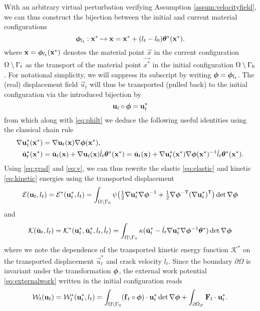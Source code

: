 With an arbitrary virtual perturbation verifying Assumption \ref{assum:velocityfield}, we can thus construct the bijection between the initial and current material configurations
\begin{equation} \label{eq:philt}
\philt_{l_t}:\vec{x}^*\mapsto\vec{x}=\vec{x}^*+(l_t-l_0)\vtheta^*(\vec{x}^*).
\end{equation}
where $\vec{x}=\philt_{l_t}(\vec{x}^*)$ denotes the material point $\vec{x}$ in the current configuration ${\Omega\setminus\Gamma_t}$ as the transport of the material point $\vec{x^*}$ in the initial configuration ${\Omega\setminus\Gamma_0}$. For notational simplicity, we will suppress its subscript by writing $\philt=\philt_{l_t}$. The (real) displacement field $\vec{u}_t$ will thus be transported (pulled back) to the initial configuration via the introduced bijection by
\begin{equation} \label{eq:transportofu}
\vec{u}_t\circ\philt=\vec{u}_t^*
\end{equation}
from which along with \eqref{eq:philt} we deduce the following useful identities using the classical chain rule
\begin{align}
\nabla\vec{u}_t^*(\vec{x}^*) &= \nabla\vec{u}_t(\vec{x})\nabla\philt(\vec{x}^*), \label{eq:grad} \\
\dot{\vec{u}}_t^*(\vec{x}^*) &= \dot{\vec{u}}_t(\vec{x})+\nabla\vec{u}_t(\vec{x})\dot{l}_t\vtheta^*(\vec{x}^*)=\dot{\vec{u}}_t(\vec{x})+\nabla\vec{u}_t^*(\vec{x}^*)\nabla\philt(\vec{x}^*)^{-1}\dot{l}_t\vtheta^*(\vec{x}^*). \label{eq:v}
\end{align}
Using \eqref{eq:grad} and \eqref{eq:v}, we can thus rewrite the elastic \eqref{eq:elastic} and kinetic \eqref{eq:kinetic} energies using the transported displacement
\begin{equation} \label{eq:elastici}
\mathcal{E}(\vec{u}_t,l_t)=\mathcal{E}^*(\vec{u}_t^*,l_t)=\int_\domaini\psi\bigl({\textstyle\frac{1}{2}}\nabla\vec{u}_t^*\nabla\philt^{-1}+{\textstyle\frac{1}{2}}\nabla\philt^{-\mathsf{T}}(\nabla\vec{u}_t^*)^\mT\bigr)\det\nabla\philt
\end{equation}
and
\begin{equation} \label{eq:kinetici}
\mathcal{K}(\dot{\vec{u}}_t,l_t)=\mathcal{K}^*(\vec{u}_t^*,\dot{\vec{u}}_t^*,l_t,\dot{l}_t)=\int_\domaini\kappa(\dot{\vec{u}}_t^*-\dot{l}_t\nabla\vec{u}_t^*\nabla\philt^{-1}\vtheta^*)\det\nabla\philt
\end{equation}
where we note the dependence of the transported kinetic energy function $\mathcal{K}^*$ on the transported displacement $\vec{u}_t^*$ and crack velocity $\dot{l}_t$. Since the boundary $\partial\Omega$ is invariant under the transformation $\philt$, the external work potential \eqref{eq:externalwork} written in the initial configuration reads
\begin{equation} \label{eq:externalworki}
\mathcal{W}_t(\vec{u}_t)=\mathcal{W}^*_t(\vec{u}_t^*,l_t)=\int_\domaini (\vec{f}_t\circ\philt)\cdot\vec{u}_t^*\det\nabla\philt+\int_{\partial\Omega_F} \vec{F}_t\cdot\vec{u}_t^*.
\end{equation}

